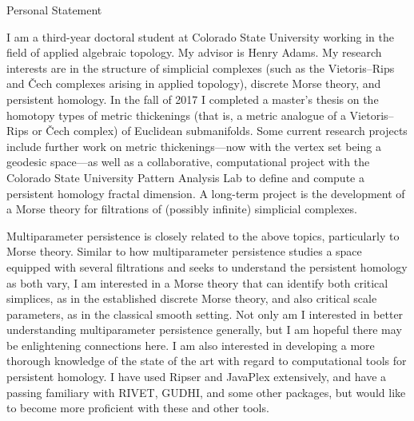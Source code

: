 \documentclass[11pt,letterpaper,sans]{moderncv}        %
\begin{document}
\clearpage
\opening{Personal Statement}
\makelettertitle




I am a third-year doctoral student at Colorado State University working in the field of applied algebraic topology. 
My advisor is Henry Adams.
My research interests are in the structure of simplicial complexes (such as the Vietoris--Rips and \v{C}ech complexes arising in applied topology), discrete Morse theory, and persistent homology.
In the fall of 2017 I completed a master's thesis on the homotopy types of metric thickenings (that is, a metric analogue of a Vietoris--Rips or \v{C}ech complex) of Euclidean submanifolds.
Some current research projects include further work on metric thickenings---now with the vertex set being a geodesic space---as well as a collaborative, computational project with the Colorado State University Pattern Analysis Lab to define and compute a persistent homology fractal dimension.
A long-term project is the development of a Morse theory for filtrations of (possibly infinite) simplicial complexes.

Multiparameter persistence is closely related to the above topics, particularly to Morse theory.
Similar to how multiparameter persistence studies a space equipped with several filtrations and seeks to understand the persistent homology as both vary, I am interested in a Morse theory that can identify both critical simplices, as in the established discrete Morse theory, and also critical scale parameters, as in the classical smooth setting.
Not only am I interested in better understanding multiparameter persistence generally, but I am hopeful there may be enlightening connections here.
I am also interested in developing a more thorough knowledge of the state of the art with regard to computational tools for persistent homology. 
I have used Ripser and JavaPlex extensively, and have a passing familiary with RIVET, GUDHI, and some other packages, but would like to become more proficient with these and other tools.
\end{document}
